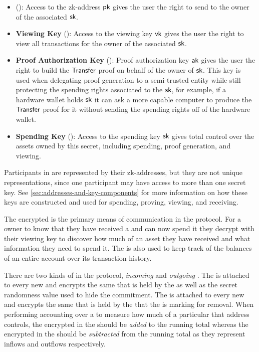 \begin{itemize}
    \item \textbf{\zkAddress{}} (\send{}): Access to the zk-address ${\textsf{pk}}$ gives the user the right to send  to the owner of the associated ${\textsf{sk}}$. 
    \item \textbf{Viewing Key} (\view{}): Access to the viewing key ${\textsf{vk}}$ gives the user the right to view all transactions for the owner of the associated ${\textsf{sk}}$.
    \item \textbf{Proof Authorization Key} (\prove{}): Proof authorization key ${\textsf{ak}}$ gives the user the right to build the ${\textsf{Transfer}}$ proof on behalf of the owner of ${\textsf{sk}}$. This key is used when delegating proof generation to a semi-trusted entity while still protecting the spending rights associated to the ${\textsf{sk}}$, for example, if a hardware wallet holds ${\textsf{sk}}$ it can ask a more capable computer to produce the ${\textsf{Transfer}}$ proof for it without sending the spending rights off of the hardware wallet.
    \item \textbf{Spending Key} (\spend{}): Access to the spending key ${\textsf{sk}}$ gives total control over the assets owned by this secret, including spending, proof generation, and viewing.
\end{itemize}

Participants in \MantaPay{} are represented by their zk-addresses, but they are not unique representations, since one participant may have access to more than one secret key. See \autoref{sec:addresses-and-key-components} for more information on how these keys are constructed and used for spending, proving, viewing, and receiving.


The encrypted \Note{} is the primary means of communication in the \MantaPay{} protocol. For a \zkAddress{} owner to know that they have received a \zkAsset{} and can now spend it they decrypt  with their viewing key to discover how much of an asset they have received and what information they need to spend it. The \Note{} is also used to keep track of the balances of an entire account over its transaction history.

There are two kinds of  in the \MantaPay{} protocol, \emph{incoming}  and \emph{outgoing} . The \IncomingNote{} is attached to every new \UTXO{} and encrypts the same \Asset{} that is held by the \UTXO{} as well as the secret randomness value used to hide the \UTXO{} commitment. The \OutgoingNote{} is attached to every new \Nullifier{} and encrypts the same \Asset{} that is held by the \UTXO{} that the \Nullifier{} is marking for removal. When performing accounting over a \zkAddress{} to measure how much of a particular \AssetId{} that address controls, the \AssetValue{} encrypted in the  should be \emph{added} to the running total whereas the \AssetValue{} encrypted in the  should be \emph{subtracted} from the running total as they represent inflows and outflows respectively.

